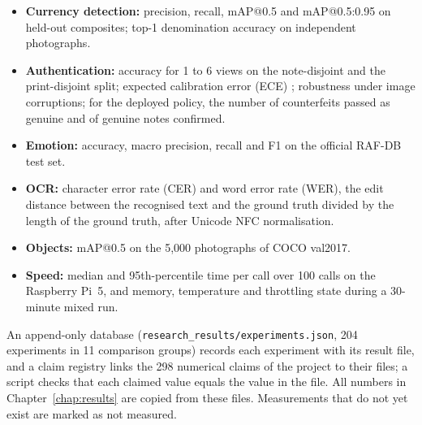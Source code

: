 \begin{itemize}[noitemsep]
    \item \textbf{Currency detection:} precision, recall, mAP@0.5 and mAP@0.5:0.95 on held-out composites; top-1 denomination accuracy on independent photographs.
    \item \textbf{Authentication:} accuracy for 1 to 6 views on the note-disjoint and the print-disjoint split; expected calibration error (ECE) \cite{guo2017calibration}; robustness under image corruptions; for the deployed policy, the number of counterfeits passed as genuine and of genuine notes confirmed.
    \item \textbf{Emotion:} accuracy, macro precision, recall and F1 on the official RAF-DB test set.
    \item \textbf{OCR:} character error rate (CER) and word error rate (WER), the edit distance \cite{levenshtein1966} between the recognised text and the ground truth divided by the length of the ground truth, after Unicode NFC normalisation.
    \item \textbf{Objects:} mAP@0.5 on the 5,000 photographs of COCO val2017.
    \item \textbf{Speed:} median and 95th-percentile time per call over 100 calls on the Raspberry Pi~5, and memory, temperature and throttling state during a 30-minute mixed run.
\end{itemize}
An append-only database (\texttt{research\_results/experiments.json}, 204 experiments in 11 comparison groups) records each experiment with its result file, and a claim registry links the 298 numerical claims of the project to their files; a script checks that each claimed value equals the value in the file.
All numbers in Chapter~\ref{chap:results} are copied from these files. Measurements that do not yet exist are marked as not measured.

